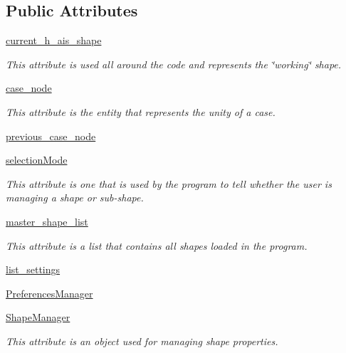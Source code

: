 \subsection*{Public Attributes}
\begin{DoxyCompactItemize}
\item 
\hyperlink{class_core_1_1_blade_py_core_a84a62c3017515ec840e35dbbe8ccbf21}{current\+\_\+h\+\_\+ais\+\_\+shape}
\begin{DoxyCompactList}\small\item\em This attribute is used all around the code and represents the \char`\"{}working\char`\"{} shape. \end{DoxyCompactList}\item 
\hyperlink{class_core_1_1_blade_py_core_a76f4a1191b8d68c0ed9d9f3e1e6756d8}{case\+\_\+node}
\begin{DoxyCompactList}\small\item\em This attribute is the entity that represents the unity of a case. \end{DoxyCompactList}\item 
\hyperlink{class_core_1_1_blade_py_core_a43d75821c1883b1b972c8e0ef9922b4a}{previous\+\_\+case\+\_\+node}
\item 
\hyperlink{class_core_1_1_blade_py_core_a84adec7b4b982bce58747d39e098236f}{selection\+Mode}
\begin{DoxyCompactList}\small\item\em This attribute is one that is used by the program to tell whether the user is managing a shape or sub-\/shape. \end{DoxyCompactList}\item 
\hyperlink{class_core_1_1_blade_py_core_a819ef9e1cd2f233d92a5379532060bd0}{master\+\_\+shape\+\_\+list}
\begin{DoxyCompactList}\small\item\em This attribute is a list that contains all shapes loaded in the program. \end{DoxyCompactList}\item 
\hyperlink{class_core_1_1_blade_py_core_a96038d8a4727208ba2e9cd359bcd4781}{list\+\_\+settings}
\item 
\hyperlink{class_core_1_1_blade_py_core_abfb58254f95f980e2821bac01114cd40}{Preferences\+Manager}
\item 
\hyperlink{class_core_1_1_blade_py_core_a1e75ee619926a396b584090b2707b1ca}{Shape\+Manager}
\begin{DoxyCompactList}\small\item\em This attribute is an object used for managing shape properties. \end{DoxyCompactList}\item 

\end{DoxyCompactItemize}

